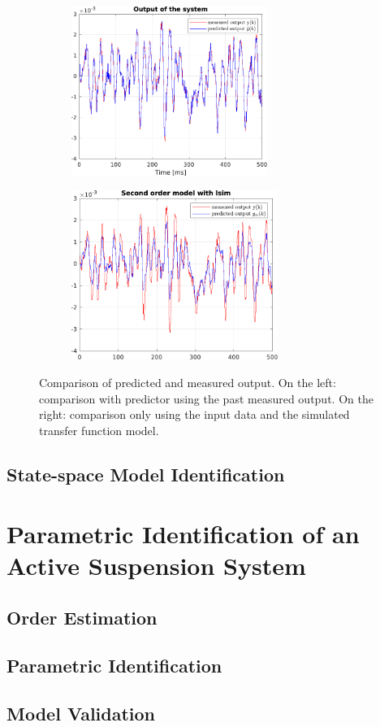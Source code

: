 \documentclass{scrartcl}
\newcommand*{\matlabcode}[3]{\begin{figure}[h!]\end{figure}}
\begin{document}
\begin{figure}[h]
	\centering
	\begin{subfigure}{.49\textwidth}
		\includegraphics[height=5.5cm]{figures/output_arx.pdf}
		\label{fig:output_arx}
	\end{subfigure}\hfill
	\begin{subfigure}{.49\textwidth}
		\includegraphics[height=5.5cm]{figures/output_lsim2.pdf}
		\label{fig:output_lsim2}
	\end{subfigure}
	\caption{Comparison of predicted and measured output. On the left: comparison with predictor using the past measured output. On the right: comparison only using the input data and the simulated transfer function model.}
\end{figure}

\matlabcode{../matlab/ce2/ARX_model_identification.m}{Matlab function for the ARX model identification technique.}{lst:FIR}

\subsection{State-space Model Identification}

\newpage
\section{Parametric Identification of an Active Suspension System}
\subsection{Order Estimation}
\subsection{Parametric Identification}
\subsection{Model Validation}
\end{document}
